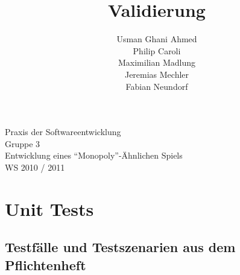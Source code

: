 \documentclass[a4paper,10pt]{article}
\title{Validierung}
\date{}
\author{Usman Ghani Ahmed \\
Philip Caroli\\
Maximilian Madlung\\ 
Jeremias Mechler\\ 
Fabian Neundorf}
\begin{document}
 
\vspace{5cm}
\maketitle
\begin{center}
\vspace{3cm}
\huge{Praxis der Softwareentwicklung \\
Gruppe 3 \\[0.5cm]
Entwicklung eines "`Monopoly"'-Ähnlichen Spiels \\[0.5cm]
WS 2010 / 2011} \\[2cm]
\end{center}

\newpage

\tableofcontents

\newpage

\section{Unit Tests}

\subsection{Testfälle und Testszenarien aus dem Pflichtenheft}
\end{document}
